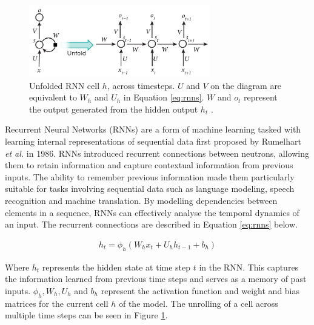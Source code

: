 \begin{figure}[H]
    \centering
    \includegraphics[width=0.7\textwidth]{graphs/rnn.png}
    \caption{Unfolded RNN cell $h$, across timesteps. $U$ and $V$ on the diagram are equivalent to $W_{h}$ and $U_{h}$ in Equation \ref{eq:rnns}. $W$ and $o_{t}$ represent the output generated from the hidden output $h_{t}$ \cite{RNN_diagram}.}
    \label{fig:rnn}
\end{figure}

Recurrent Neural Networks (RNNs) are a form of machine learning tasked with learning internal representations of sequential data first proposed by Rumelhart \textit{et al.} \cite{rnns} in 1986. RNNs introduced recurrent connections between neutrons, allowing them to retain information and capture contextual information from previous inputs. The ability to remember previous information made them particularly suitable for tasks involving sequential data such as language modeling, speech recognition and machine translation. By modelling dependencies between elements in a sequence, RNNs can effectively analyse the temporal dynamics of an input. The recurrent connections are described in Equation \ref{eq:rnns} below.

\begin{equation}
    \begin{gathered}
        h_{t} = \phi_{h}\left( W_{h}x_{t} + U_{h}h_{t-1} + b_{h} \right)
    \end{gathered}
    \label{eq:rnns}
\end{equation}

Where $h_{t}$ represents the hidden state at time step $t$ in the RNN. This captures the information learned from previous time steps and serves as a memory of past inputs. $\phi_{h}, W_{h}, U_{h}$ and $b_{h}$ represent the activation function and weight and bias matrices for the current cell $h$ of the model. The unrolling of a cell across multiple time steps can be seen in Figure \ref{fig:rnn}.

